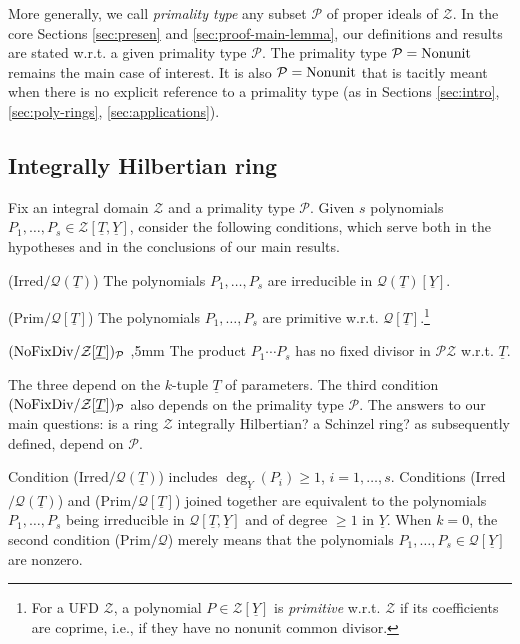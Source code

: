 \documentclass[11pt,a4paper,reqno]{amsart}
\theoremstyle{definition}
\begin{document}
More generally, we call \emph{primality type} any subset ${\mathcal P}$ of proper ideals of ${\mathcal Z}$. In the core Sections \ref{sec:presen} and  \ref{sec:proof-main-lemma}, our definitions and results are stated \hbox{w.r.t.} a given primality type ${\mathcal P}$.
The primality type ${\mathcal P} = {\rm Nonunit}$ remains the main case of interest. It is also ${\mathcal P} = {\rm Nonunit}$ that is tacitly meant when there is no explicit reference to a primality type (as in Sections \ref{sec:intro}, \ref{sec:poly-rings}, \ref{sec:applications}).


\subsection{Integrally Hilbertian ring} \label{ssec:int-Hilb-ring} Fix an integral domain ${\mathcal Z}$ and a primality type ${\mathcal P}$. Given $s$ polynomials $P_1,\ldots,P_s \in {\mathcal Z}[\underline{T},\underline{Y}]$, consider the following conditions, which serve both in the hypotheses and in the conclusions of our main results. 
\vskip 2mm

\noindent
(Irred$/{\mathcal Q}(\underline T)$) \hskip 10mm The polynomials $P_1,\ldots,P_s$ are irreducible in ${\mathcal Q}(\underline T)[\underline Y]$. 
\vskip 1mm

\noindent
(Prim$/{\mathcal Q}[\underline T]$) \hskip 11mm The polynomials $P_1,\ldots,P_s$ are primitive \hbox{w.r.t.} ${\mathcal Q}[\underline T]$.\footnote{For a UFD ${\mathcal Z}$, a polynomial $P\in {\mathcal Z}[\underline Y]$ is \emph{primitive} \hbox{w.r.t.} ${\mathcal Z}$ if its coefficients are coprime, \hbox{i.e.}, if they have no nonunit common divisor.}
\vskip 1mm

\noindent
$\hbox{\rm (NoFixDiv}/{\mathcal Z}[\underline T])_{\mathcal P}$ ,5mm
The product $P_1\cdots P_s$ has no fixed divisor in ${\mathcal P}{\mathcal Z}$ \hbox{w.r.t.} ${\underline T}$. 
\vskip 2mm

The three depend on the $k$-tuple ${\underline T}$ of parameters. The third condition $\hbox{\rm (NoFixDiv}/{\mathcal Z}[\underline T])_{\mathcal P}$ also depends on the primality type ${\mathcal P}$. The answers to our main questions: is a ring ${\mathcal Z}$ integrally Hilbertian? a Schinzel ring? as subsequently defined, depend on ${\mathcal P}$.

Condition (Irred$/{\mathcal Q}(\underline T)$) includes $\deg_{\underline Y}(P_i)\geq 1$, $i=1,\ldots,s$. Conditions (Irred$/{\mathcal Q}(\underline T)$) and (Prim$/{\mathcal Q}[\underline T]$) joined together are equivalent to the polynomials $P_1,\ldots,P_s$ being irreducible in ${\mathcal Q}[\underline T,\underline Y]$ and of degree $\geq 1$ in ${\underline Y}$. When $k=0$, the second condition (Prim$/{\mathcal Q}$) merely means that 
the polynomials $P_1,\ldots,P_s\in {\mathcal Q}[\underline Y]$ are nonzero.
\end{document}
